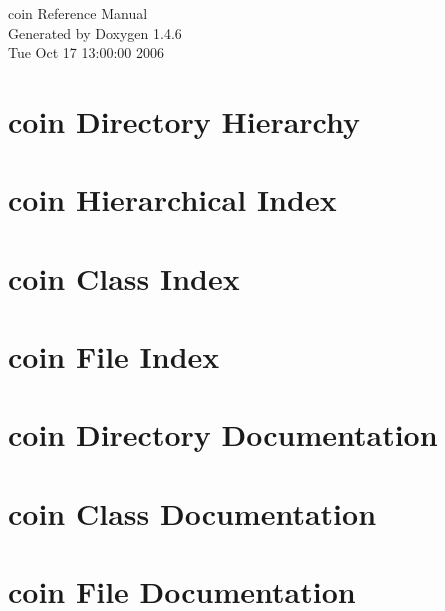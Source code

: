 \documentclass[a4paper]{book}
\begin{document}
\begin{titlepage}
\vspace*{7cm}
\begin{center}
{\Large coin Reference Manual}\\
\vspace*{1cm}
{\large Generated by Doxygen 1.4.6}\\
\vspace*{0.5cm}
{\small Tue Oct 17 13:00:00 2006}\\
\end{center}
\end{titlepage}
\clearemptydoublepage
{}
\tableofcontents
\clearemptydoublepage
{}
\chapter{coin Directory Hierarchy}

\chapter{coin Hierarchical Index}

\chapter{coin Class Index}

\chapter{coin File Index}

\chapter{coin Directory Documentation}

\chapter{coin Class Documentation}

\chapter{coin File Documentation}









\printindex
\end{document}
